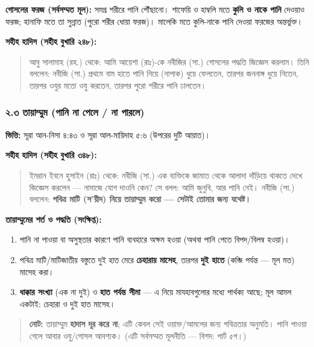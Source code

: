 \textbf{গোসলের ফরজ (সর্বসম্মত মূল):} সমগ্র শরীরে পানি পৌঁছানো। শাফেয়ি ও হাম্বলি মতে \textbf{কুলি ও নাকে পানি} দেওয়াও ফরজ; হানাফি মতে তা সুন্নাত (পুরো শরীর ধোয়া ফরজ)। মালেকি মতে কুলি-নাকে পানি দেওয়া ফরজের অন্তর্ভুক্ত।

\textbf{সহীহ হাদিস (সহীহ বুখারি ২৪৮):}

\begin{quote}
আবু সালামাহ (রহ.) থেকে: আমি আয়েশা (রাঃ)-কে নবীজির (সা.) গোসলের পদ্ধতি জিজ্ঞেস করলাম। তিনি বললেন: নবীজি (সা.) প্রথমে বাম হাতে পানি নিয়ে (নাপাক) ধুয়ে ফেলতেন, তারপর জননাঙ্গ ধুয়ে নিতেন, তারপর ওযুর মতো ওযু করতেন, তারপর পুরো শরীরে পানি ঢালতেন।
\end{quote}

\subsubsection*{২.৩ তায়াম্মুম (পানি না পেলে / না পারলে)}

\textbf{ভিত্তি:} সূরা আন-নিসা ৪:৪৩ ও সূরা আল-মায়িদাহ ৫:৬ (উপরের দুটি আয়াত)।

\textbf{সহীহ হাদিস (সহীহ বুখারি ৩৪৮):}

\begin{quote}
ইমরান ইবনে হুসাইন (রাঃ) থেকে: নবীজি (সা.) এক ব্যক্তিকে জামাত থেকে আলাদা দাঁড়িয়ে থাকতে দেখে জিজ্ঞেস করলেন — নামাজে যোগ দাওনি কেন? সে বলল: আমি জুনুবি, আর পানি নেই। নবীজি (সা.) বললেন: \textbf{পবিত্র মাটি (স'য়ীদ) নিয়ে তায়াম্মুম করো — সেটাই তোমার জন্য যথেষ্ট।}
\end{quote}

\textbf{তায়াম্মুমের শর্ত ও পদ্ধতি (সংক্ষিপ্ত):}
\begin{enumerate}
\item পানি না পাওয়া বা অসুস্থতার কারণে পানি ব্যবহারে অক্ষম হওয়া (অথবা পানি পেতে বিপদ/বিলম্ব হওয়া)।
\item পবিত্র মাটি/মাটিজাতীয় বস্তুতে দুই হাত মেরে \textbf{চেহারায় মাসেহ}, তারপর \textbf{দুই হাতে} (কব্জি পর্যন্ত — মূল মত) মাসেহ করা।
\item \textbf{ধাক্কার সংখ্যা} (এক না দুই) ও \textbf{হাত পর্যন্ত সীমা} — এ নিয়ে মাযহাবগুলোর মধ্যে পার্থক্য আছে; মূল আমল একটাই: চেহারা ও দুই হাত মাসেহ।
\end{enumerate}
\begin{quote}
\textbf{নোট:} তায়াম্মুম \textbf{হাদাস দূর করে না}; এটি কেবল সেই ওয়াক্ত/আমলের জন্য পবিত্রতার অনুমতি। পানি পাওয়া গেলে আবার ওযু/গোসল আবশ্যক। (এটি সর্বসম্মত মূলনীতি — বিশদ: পার্ট ৫গ।)
\end{quote}

